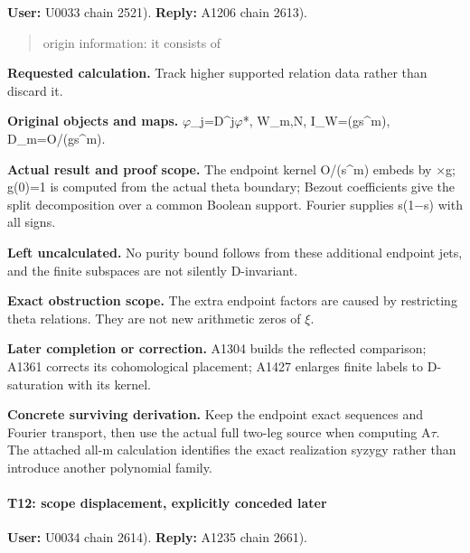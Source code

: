 \textbf{User:} U0033
\protect{} chain 2521).
\textbf{Reply:} A1206
\protect{} chain 2613).

\begin{quote}
origin information: it consists of
\end{quote}

\textbf{Requested calculation.} Track higher supported relation data
rather than discard it.

\textbf{Original objects and maps.}
\allowbreak{}\ensuremath{φ}\allowbreak{}\_j=D\textasciicircum{}j\allowbreak{}\ensuremath{φ}\allowbreak{}*,
W\_m,N, I\_W=(gs\^{}m), D\_m=O/(gs\^{}m).

\textbf{Actual result and proof scope.} The endpoint kernel O/(s\^{}m)
embeds by \allowbreak{}\ensuremath{×}\allowbreak{}g; g(0)=1 is computed
from the actual theta boundary; Bezout coefficients give the split
decomposition over a common Boolean support. Fourier supplies
s(1\allowbreak{}\ensuremath{−}\allowbreak{}s) with all signs.

\textbf{Left uncalculated.} No purity bound follows from these
additional endpoint jets, and the finite subspaces are not silently
D-invariant.

\textbf{Exact obstruction scope.} The extra endpoint factors are caused
by restricting theta relations. They are not new arithmetic zeros of
\allowbreak{}\ensuremath{ξ}\allowbreak{}.

\textbf{Later completion or correction.} A1304 builds the reflected
comparison; A1361 corrects its cohomological placement; A1427 enlarges
finite labels to D-saturation with its kernel.

\textbf{Concrete surviving derivation.} Keep the endpoint exact
sequences and Fourier transport, then use the actual full two-leg source
when computing A\allowbreak{}\ensuremath{τ}\allowbreak{}. The attached
all-m calculation identifies the exact realization syzygy rather than
introduce another polynomial family.

\paragraph{T12: scope displacement, explicitly conceded
later}\label{t12-scope-displacement-explicitly-conceded-later}

\textbf{User:} U0034
\protect{} chain 2614).
\textbf{Reply:} A1235
\protect{} chain 2661).

